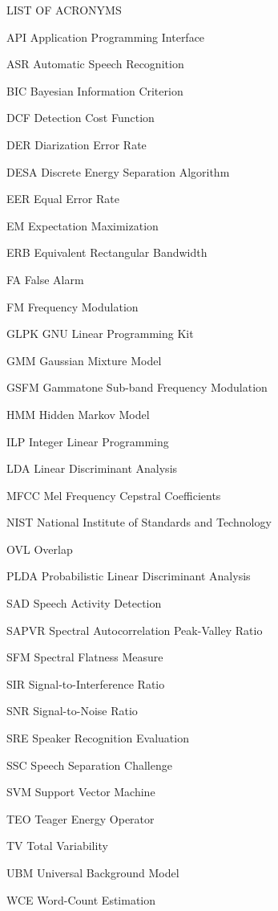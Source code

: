 \documentclass[doublespacing]{utdthesis}
\newcommand{\abbrlabel}[1]{\makebox[3cm][l]{\textbf{#1}\ \dotfill}}
\newenvironment{abbreviations}{\begin{list}{}{\renewcommand{\makelabel}{\abbrlabel}}}{\end{list}}
\begin{document}
\newpage
LIST OF ACRONYMS
\begin{abbreviations}
	\item[API] Application Programming Interface
	\item[ASR] Automatic Speech Recognition
	\item[BIC] Bayesian Information Criterion
	\item[DCF] Detection Cost Function
	\item[DER] Diarization Error Rate
	\item[DESA] Discrete Energy Separation Algorithm
	\item[EER] Equal Error Rate
	\item[EM] Expectation Maximization
	\item[ERB] Equivalent Rectangular Bandwidth
	\item[FA] False Alarm
	\item[FM] Frequency Modulation
	\item[GLPK] GNU Linear Programming Kit
	\item[GMM] Gaussian Mixture Model
	\item[GSFM] Gammatone Sub-band Frequency Modulation
	\item[HMM] Hidden Markov Model
	\item[ILP] Integer Linear Programming
	\item[LDA] Linear Discriminant Analysis
	\item[MFCC] Mel Frequency Cepstral Coefficients
	\item[NIST] National Institute of Standards and Technology
	\item[OVL] Overlap
	\item[PLDA] Probabilistic Linear Discriminant Analysis
	\item[SAD] Speech Activity Detection
	\item[SAPVR] Spectral Autocorrelation Peak-Valley Ratio
	\item[SFM] Spectral Flatness Measure
	\item[SIR] Signal-to-Interference Ratio
	\item[SNR] Signal-to-Noise Ratio
	\item[SRE] Speaker Recognition Evaluation
	\item[SSC] Speech Separation Challenge
	\item[SVM] Support Vector Machine
	\item[TEO] Teager Energy Operator
	\item[TV] Total Variability
	\item[UBM] Universal Background Model
	\item[WCE] Word-Count Estimation
\end{abbreviations}
\end{document}
